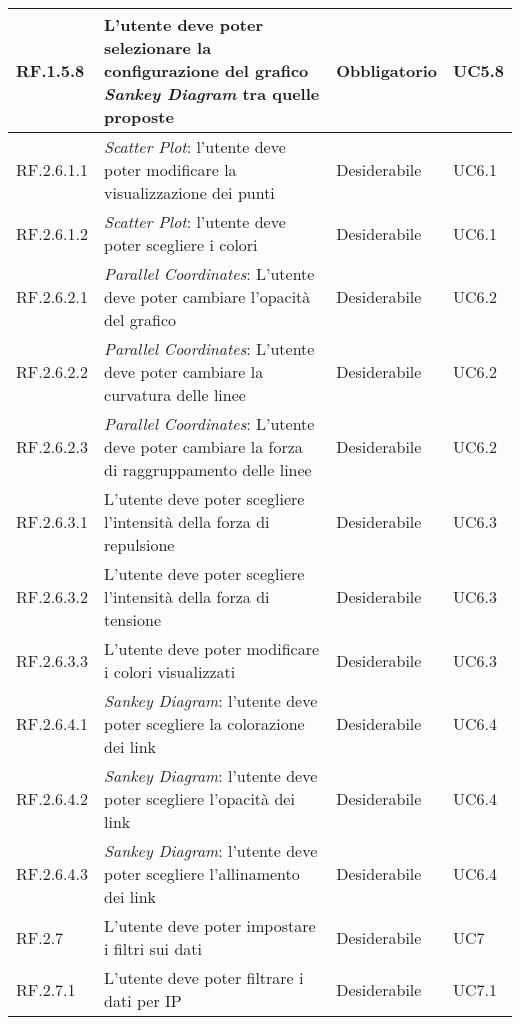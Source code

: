 \begin{center}
\begin{longtable}{|L{1,5cm}|C{5,5cm}|C{3cm}|C{2cm}|}
    RF.1.5.8 & L'utente deve poter selezionare la configurazione del grafico \textit{Sankey Diagram} tra quelle proposte& Obbligatorio & UC5.8 \\ \hline
    RF.2.6.1.1 & \textit{Scatter Plot}: l'utente deve poter modificare la visualizzazione dei punti & Desiderabile & UC6.1 \\ \hline
    RF.2.6.1.2 & \textit{Scatter Plot}: l'utente deve poter scegliere i colori  & Desiderabile & UC6.1 \\ \hline
    RF.2.6.2.1 & \textit{Parallel Coordinates}: L'utente deve poter cambiare l'opacità del grafico & Desiderabile & UC6.2 \\ \hline
    RF.2.6.2.2 & \textit{Parallel Coordinates}: L'utente deve poter cambiare la curvatura delle linee & Desiderabile & UC6.2 \\ \hline
    RF.2.6.2.3 & \textit{Parallel Coordinates}: L'utente deve poter cambiare la forza di raggruppamento delle linee & Desiderabile & UC6.2 \\ \hline
    RF.2.6.3.1 & L'utente deve poter scegliere l'intensità della forza di repulsione & Desiderabile & UC6.3 \\ \hline
    RF.2.6.3.2 & L'utente deve poter scegliere l'intensità della forza di tensione & Desiderabile & UC6.3 \\ \hline
    RF.2.6.3.3 & L'utente deve poter modificare i colori visualizzati & Desiderabile & UC6.3 \\ \hline
    RF.2.6.4.1 & \textit{Sankey Diagram}: l'utente deve poter scegliere la colorazione dei link & Desiderabile & UC6.4 \\ \hline
    RF.2.6.4.2 & \textit{Sankey Diagram}: l'utente deve poter scegliere l'opacità dei link & Desiderabile & UC6.4 \\ \hline
    RF.2.6.4.3 & \textit{Sankey Diagram}: l'utente deve poter scegliere l'allinamento dei link & Desiderabile & UC6.4 \\ \hline
    RF.2.7 & L'utente deve poter impostare i filtri sui dati & Desiderabile & UC7 \\ \hline
    RF.2.7.1 & L'utente deve poter filtrare i dati per IP & Desiderabile & UC7.1 \\ \hline

\end{longtable}
\end{center}
